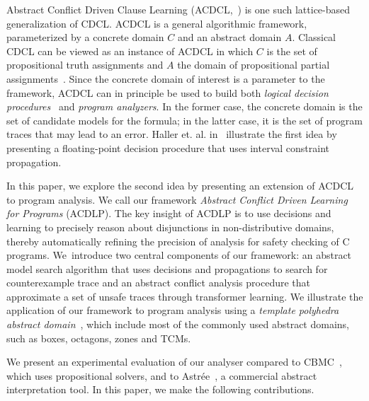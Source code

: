Abstract Conflict Driven Clause Learning (ACDCL,~\cite{dhk2013-popl}) is one 
such lattice-based generalization of CDCL.  ACDCL is a general algorithmic 
framework, parameterized by a concrete domain $C$  and an abstract domain
$A$. Classical CDCL can be viewed as an instance of ACDCL 
in which $C$ is the set of propositional truth assignments and $A$ the 
domain of propositional partial assignments~\cite{leo-thesis}.  Since 
the concrete domain of interest is a parameter to the framework, 
ACDCL can in principle be used to build both 
\emph{logical decision procedures}~\cite{DBLP:journals/fmsd/BrainDGHK14} 
and \emph{program analyzers}.  In the former case, the concrete domain is the 
set of candidate models for the formula; in the latter case, it is the 
set of program traces that may lead to an error.  Haller et. al. 
in~\cite{DBLP:journals/fmsd/BrainDGHK14} illustrate the 
first idea by presenting a floating-point decision procedure that uses interval 
constraint propagation.
%


In this paper, we explore the second idea by presenting an extension of 
ACDCL to program analysis.  We call our 
framework \emph{Abstract Conflict Driven Learning for Programs}
(ACDLP).  The key insight of ACDLP is to use decisions and learning to precisely 
reason about disjunctions in non-distributive domains, thereby automatically 
refining the precision of analysis for safety checking of C programs.  
We~introduce two central components of our framework: an abstract
model search algorithm that uses decisions and propagations to 
search for counterexample trace and an abstract conflict analysis 
procedure that approximate a set of unsafe traces through transformer 
learning.
We illustrate the application of our framework to program analysis 
using a \textit{template polyhedra abstract domain}~\cite{vmcai05}, 
which include most of the commonly used abstract domains, such as boxes, 
octagons, zones and TCMs.  

We present an experimental evaluation of our analyser compared 
to CBMC~\cite{cbmc.tacas:2004}, which uses propositional solvers, and to 
Astr{\'e}e~\cite{DBLP:conf/pldi/BlanchetCCFMMMR03}, a commercial abstract 
interpretation tool.  In this paper, we make the following contributions.

